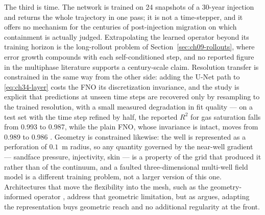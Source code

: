The third is time. The network is trained on 24 snapshots of a 30-year injection
and returns the whole trajectory in one pass; it is not a time-stepper, and it
offers no mechanism for the centuries of post-injection migration on which
containment is actually judged. Extrapolating the learned operator beyond its
training horizon is the long-rollout problem of
Section~\ref{sec:ch09-rollouts}, where error growth compounds with each
self-conditioned step, and no reported figure in the multiphase literature supports
a century-scale claim. Resolution transfer is constrained in the same way from the
other side: adding the U-Net path to \eqref{eq:ch34-layer} costs the FNO its
discretization invariance, and the study is explicit that predictions at unseen
time steps are recovered only by resampling to the trained resolution, with a small
measured degradation in fit quality --- on a test set with the time step refined by
half, the reported $R^2$ for gas saturation falls from 0.993 to 0.987, while the
plain FNO, whose invariance is intact, moves from 0.989 to 0.986
\cite{wen2022ufno}. Geometry is constrained
likewise: the well is represented as a perforation of $0.1$~m radius, so any
quantity governed by the near-well gradient --- sandface pressure, injectivity,
skin --- is a property of the grid that produced it rather than of the continuum,
and a faulted three-dimensional multi-well field model is a different training
problem, not a larger version of this one. Architectures that
move the flexibility into the mesh, such as the geometry-informed operator
\cite{li2023geometry}, address that geometric limitation, but as
 argues, adapting the
representation buys geometric reach and no additional regularity at the front.


